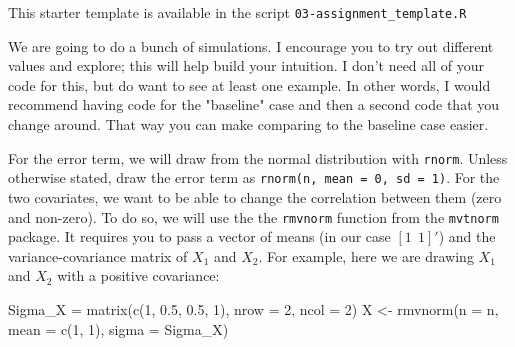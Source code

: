\documentclass[12pt]{article}
\begin{document}
This starter template is available in the script \texttt{03-assignment\_template.R}

We are going to do a bunch of simulations.
I encourage you to try out different values and explore; this will help build your intuition.
I don't need all of your code for this, but do want to see at least one example.
In other words, I would recommend having code for the "baseline" case and then a second code that you change around. That way you can make comparing to the baseline case easier.

For the error term, we will draw from the normal distribution with \texttt{rnorm}. Unless otherwise stated, draw the error term as \texttt{rnorm(n, mean = 0, sd = 1)}.
For the two covariates, we want to be able to change the correlation between them (zero and non-zero).
To do so, we will use the the \texttt{rmvnorm} function from the \texttt{mvtnorm} package.
It requires you to pass a vector of means (in our case $[1 \ \ 1]'$) and the variance-covariance matrix of $X_1$ and $X_2$.
For example, here we are drawing $X_1$ and $X_2$ with a positive covariance:
\begin{codeblock}
Sigma_X = matrix(c(1, 0.5, 0.5, 1), nrow = 2, ncol = 2)
X <- rmvnorm(n = n, mean = c(1, 1), sigma = Sigma_X)
\end{codeblock}
\end{document}
